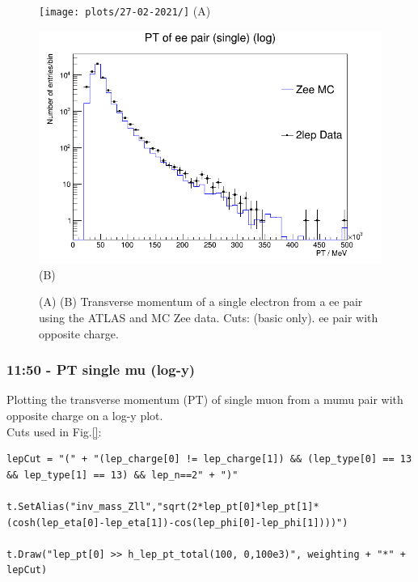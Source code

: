 \begin{figure}[h!]
    \centering
    \begin{minipage}{0.5\textwidth}
        \centering
        \texttt{[image: plots/27-02-2021/]}
        (A)
    \end{minipage}\hfill
    \begin{minipage}{0.5\textwidth}
        \centering
        \includegraphics[width=\linewidth]{plots/27-02-2021/2-Stack-Zee-fast_PT-single_log-y_(basic-cuts_2lep=ee_opp-c)_27-02-21_11-40.png}
        (B)
    \end{minipage}
    \caption{(A)  (B) Transverse momentum of a single electron from a ee pair using the ATLAS and MC Zee data.  Cuts: (basic only). ee pair with opposite charge.}
    \label{fig:Stack-Zee-fast_PT-single_log-y_(basic-cuts_2lep=ee_opp-c)_27-02-21_11-40}
\end{figure}


\subsubsection*{11:50 - PT single mu (log-y)}
Plotting the transverse momentum (PT) of single muon from a mumu pair with opposite charge on a log-y plot.
\\
Cuts used in Fig.\ref{}:
\begin{lstlisting}
lepCut = "(" + "(lep_charge[0] != lep_charge[1]) && (lep_type[0] == 13 && lep_type[1] == 13) && lep_n==2" + ")"

t.SetAlias("inv_mass_Zll","sqrt(2*lep_pt[0]*lep_pt[1]*(cosh(lep_eta[0]-lep_eta[1])-cos(lep_phi[0]-lep_phi[1])))")

t.Draw("lep_pt[0] >> h_lep_pt_total(100, 0,100e3)", weighting + "*" + lepCut)
\end{lstlisting}

